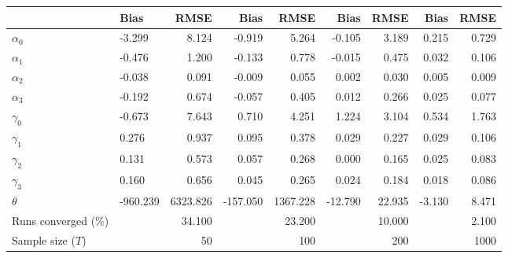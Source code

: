 
\begin{tabular}[t]{llrrrrrrr}
\toprule
  & Bias & RMSE & Bias & RMSE & Bias & RMSE & Bias & RMSE\\
\midrule
$\alpha_{0}$ & -3.299 & 8.124 & -0.919 & 5.264 & -0.105 & 3.189 & 0.215 & 0.729\\
$\alpha_{1}$ & -0.476 & 1.200 & -0.133 & 0.778 & -0.015 & 0.475 & 0.032 & 0.106\\
$\alpha_{2}$ & -0.038 & 0.091 & -0.009 & 0.055 & 0.002 & 0.030 & 0.005 & 0.009\\
$\alpha_{3}$ & -0.192 & 0.674 & -0.057 & 0.405 & 0.012 & 0.266 & 0.025 & 0.077\\
$\gamma_{0}$ & -0.673 & 7.643 & 0.710 & 4.251 & 1.224 & 3.104 & 0.534 & 1.763\\
$\gamma_{1}$ & 0.276 & 0.937 & 0.095 & 0.378 & 0.029 & 0.227 & 0.029 & 0.106\\
$\gamma_{2}$ & 0.131 & 0.573 & 0.057 & 0.268 & 0.000 & 0.165 & 0.025 & 0.083\\
$\gamma_{3}$ & 0.160 & 0.656 & 0.045 & 0.265 & 0.024 & 0.184 & 0.018 & 0.086\\
$\theta$ & -960.239 & 6323.826 & -157.050 & 1367.228 & -12.790 & 22.935 & -3.130 & 8.471\\
Runs converged (\%) &  & 34.100 &  & 23.200 &  & 10.000 &  & 2.100\\
Sample size ($T$) &  & 50 &  & 100 &  & 200 &  & 1000\\
\bottomrule
\end{tabular}
